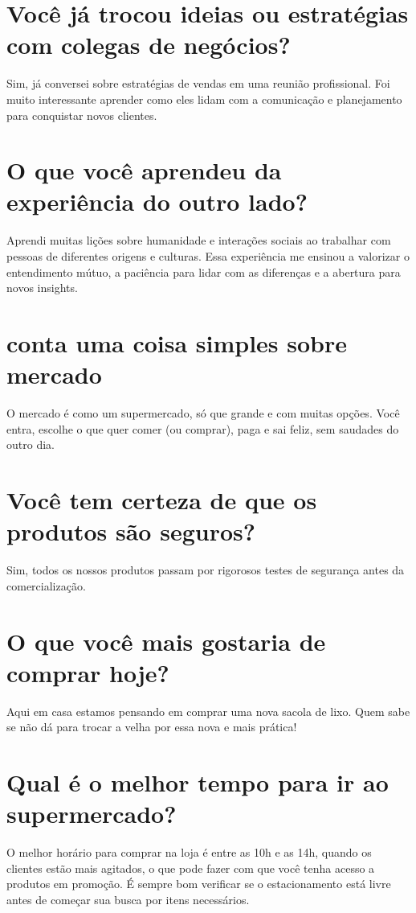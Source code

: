 \documentclass[11pt,a4paper]{article}
\begin{document}
\section{Você já trocou ideias ou estratégias com colegas de negócios?}
Sim, já conversei sobre estratégias de vendas em uma reunião profissional. Foi muito interessante aprender como eles lidam com a comunicação e planejamento para conquistar novos clientes.

\section{O que você aprendeu da experiência do outro lado?}
Aprendi muitas lições sobre humanidade e interações sociais ao trabalhar com pessoas de diferentes origens e culturas. Essa experiência me ensinou a valorizar o entendimento mútuo, a paciência para lidar com as diferenças e a abertura para novos insights.

\section{conta uma coisa simples sobre mercado}
O mercado é como um supermercado, só que grande e com muitas opções. Você entra, escolhe o que quer comer (ou comprar), paga e sai feliz, sem saudades do outro dia.

\section{Você tem certeza de que os produtos são seguros?}
Sim, todos os nossos produtos passam por rigorosos testes de segurança antes da comercialização.

\section{O que você mais gostaria de comprar hoje?}
Aqui em casa estamos pensando em comprar uma nova sacola de lixo. Quem sabe se não dá para trocar a velha por essa nova e mais prática!

\section{Qual é o melhor tempo para ir ao supermercado?}
O melhor horário para comprar na loja é entre as 10h e as 14h, quando os clientes estão mais agitados, o que pode fazer com que você tenha acesso a produtos em promoção. É sempre bom verificar se o estacionamento está livre antes de começar sua busca por itens necessários.
\end{document}
